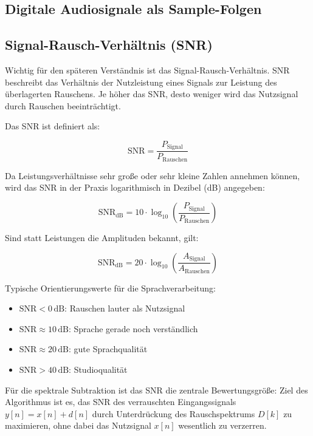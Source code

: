 \subsection{Digitale Audiosignale als Sample-Folgen}

\subsection{Signal-Rausch-Verhältnis (SNR)}
Wichtig für den späteren Verständnis ist das Signal-Rausch-Verhältnis. SNR beschreibt das Verhältnis der Nutzleistung eines Signals zur Leistung des überlagerten Rauschens. Je höher das SNR, desto weniger wird das Nutzsignal durch Rauschen beeinträchtigt.

Das SNR ist definiert als:

\begin{equation}
	\text{SNR} = \frac{P_{\text{Signal}}}{P_{\text{Rauschen}}}
\end{equation}

Da Leistungsverhältnisse sehr große oder sehr kleine Zahlen annehmen können, 
wird das SNR in der Praxis logarithmisch in Dezibel (dB) angegeben:

\begin{equation}
	\text{SNR}_{\text{dB}} = 10 \cdot \log_{10} 
	\left( \frac{P_{\text{Signal}}}{P_{\text{Rauschen}}} \right)
\end{equation}

Sind statt Leistungen die Amplituden bekannt, gilt:

\begin{equation}
	\text{SNR}_{\text{dB}} = 20 \cdot \log_{10} 
	\left( \frac{A_{\text{Signal}}}{A_{\text{Rauschen}}} \right)
\end{equation}

Typische Orientierungswerte für die Sprachverarbeitung:

\begin{itemize}
	\item $\text{SNR} < 0\,\text{dB}$: Rauschen lauter als Nutzsignal
	\item $\text{SNR} \approx 10\,\text{dB}$: Sprache gerade noch verständlich
	\item $\text{SNR} \approx 20\,\text{dB}$: gute Sprachqualität
	\item $\text{SNR} > 40\,\text{dB}$: Studioqualität
\end{itemize}

Für die spektrale Subtraktion ist das SNR die zentrale Bewertungsgröße: 
Ziel des Algorithmus ist es, das SNR des verrauschten Eingangssignals 
$y[n] = x[n] + d[n]$ durch Unterdrückung des Rauschspektrums $D[k]$ 
zu maximieren, ohne dabei das Nutzsignal $x[n]$ wesentlich zu verzerren. \cite{Loizou2013}

